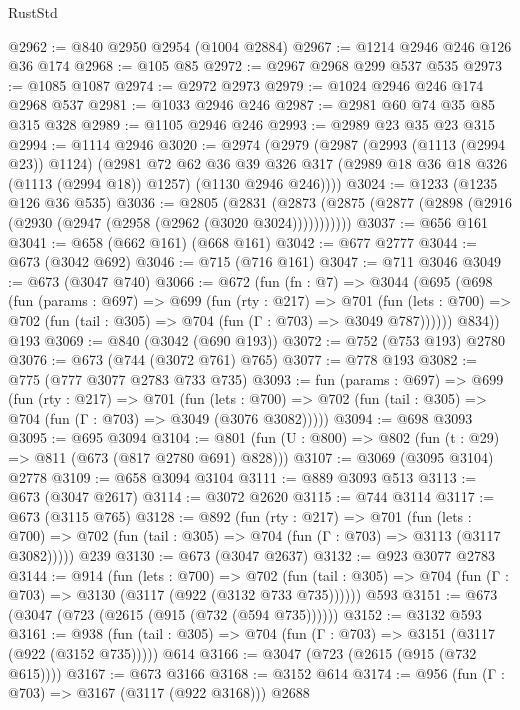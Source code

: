 \begin{lexlean}{RustStd}
\begin{coremodule}
{\begin{coremodule}
{{{{{{{{{{@2962 := @840 @2950 @2954 (@1004 @2884)
@2967 := @1214 @2946 @246 @126 @36 @174
@2968 := @105 @85
@2972 := @2967 @2968 @299 @537 @535
@2973 := @1085 @1087
@2974 := @2972 @2973
@2979 := @1024 @2946 @246 @174 @2968 @537
@2981 := @1033 @2946 @246
@2987 := @2981 @60 @74 @35 @85 @315 @328
@2989 := @1105 @2946 @246
@2993 := @2989 @23 @35 @23 @315
@2994 := @1114 @2946
@3020 := @2974
    (@2979
      (@2987
        (@2993 (@1113 (@2994 @23)) @1124)
        (@2981
          @72
          @62
          @36
          @39
          @326
          @317
          (@2989 @18 @36 @18 @326 (@1113 (@2994 @18)) @1257)
          (@1130 @2946 @246))))
@3024 := @1233 (@1235 @126 @36 @535)
@3036 := @2805
    (@2831 (@2873 (@2875 (@2877 (@2898 (@2916 (@2930 (@2947 (@2958 (@2962 (@3020 @3024)))))))))))
@3037 := @656 @161
@3041 := @658 (@662 @161) (@668 @161)
@3042 := @677 @2777
@3044 := @673 (@3042 @692)
@3046 := @715 (@716 @161)
@3047 := @711 @3046
@3049 := @673 (@3047 @740)
@3066 := @672
    (fun (fn : @7) =>
    @3044
      (@695
        (@698
          (fun (params : @697) =>
          @699
            (fun (rty : @217) =>
            @701
              (fun (lets : @700) =>
              @702 (fun (tail : @305) => @704 (fun (Γ : @703) => @3049 @787))))))
        @834))
    @193
@3069 := @840 (@3042 (@690 @193))
@3072 := @752 (@753 @193) @2780
@3076 := @673 (@744 (@3072 @761) @765)
@3077 := @778 @193
@3082 := @775 (@777 @3077 @2783 @733 @735)
@3093 := fun (params : @697) =>
  @699
    (fun (rty : @217) =>
    @701
      (fun (lets : @700) =>
      @702 (fun (tail : @305) => @704 (fun (Γ : @703) => @3049 (@3076 @3082)))))
@3094 := @698 @3093
@3095 := @695 @3094
@3104 := @801 (fun (U : @800) => @802 (fun (t : @29) => @811 (@673 (@817 @2780 @691) @828)))
@3107 := @3069 (@3095 @3104) @2778
@3109 := @658 @3094 @3104
@3111 := @889 @3093 @513
@3113 := @673 (@3047 @2617)
@3114 := @3072 @2620
@3115 := @744 @3114
@3117 := @673 (@3115 @765)
@3128 := @892
    (fun (rty : @217) =>
    @701
      (fun (lets : @700) =>
      @702 (fun (tail : @305) => @704 (fun (Γ : @703) => @3113 (@3117 @3082)))))
    @239
@3130 := @673 (@3047 @2637)
@3132 := @923 @3077 @2783
@3144 := @914
    (fun (lets : @700) =>
    @702 (fun (tail : @305) => @704 (fun (Γ : @703) => @3130 (@3117 (@922 (@3132 @733 @735))))))
    @593
@3151 := @673 (@3047 (@723 (@2615 (@915 (@732 (@594 @735))))))
@3152 := @3132 @593
@3161 := @938 (fun (tail : @305) => @704 (fun (Γ : @703) => @3151 (@3117 (@922 (@3152 @735))))) @614
@3166 := @3047 (@723 (@2615 (@915 (@732 @615))))
@3167 := @673 @3166
@3168 := @3152 @614
@3174 := @956 (fun (Γ : @703) => @3167 (@3117 (@922 @3168))) @2688
}}}}}}}}}}
\end{coremodule}}
\end{coremodule}
\end{lexlean}
